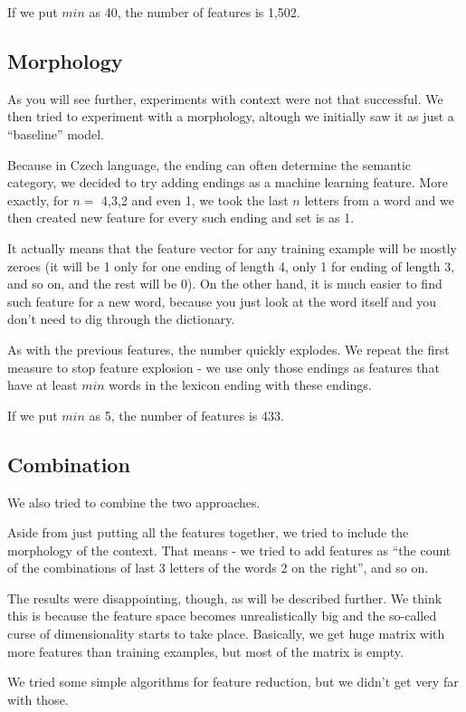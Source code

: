\documentclass[letterpaper]{article}
\begin{document}
If we put $min$ as 40, the number of features is 1,502.

\subsection{Morphology}
As you will see further, experiments with context were not that successful. 
We then tried to experiment with a morphology, altough we initially saw it as just a ``baseline'' model.

Because in Czech language, the ending can often determine the semantic category, 
we decided to try adding endings as a machine learning feature. 
More exactly, for $n=$ 4,3,2 and even 1, we took the last $n$ letters from 
a word and we then created new feature for every such ending and set is as 1.

It actually means that the feature vector for any training example will be mostly zeroes 
(it will be 1 only for one ending of length 4, only 1 for ending of length 3, and so on, 
and the rest will be 0). On the other hand, it is much easier to find such feature 
for a new word, because you just look at the word itself and you don't need to dig through the dictionary.

As with the previous features, the number quickly explodes. We repeat the first measure 
to stop feature explosion - we use only those endings as features that have at least $min$ words in the lexicon ending with these endings.

If we put $min$ as 5, the number of features is 433.

\subsection{Combination}
We also tried to combine the two approaches.

Aside from just putting all the features together, we tried to include the morphology of the context. 
That means - we tried to add features as ``the count of the combinations of last 3 letters of the words 2 on the right'', and so on.

The results were disappointing, though, as will be described further. 
We think this is because the feature space becomes unrealistically big and the so-called  curse of dimensionality starts to take place. Basically, we get huge matrix with more features than training examples, but most of the matrix is empty.

We tried some simple algorithms for feature reduction, but we didn't get very far with those.
\end{document}
